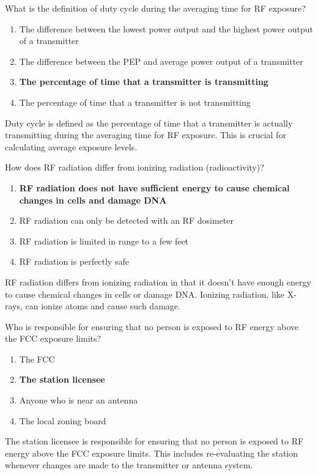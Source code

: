 \begin{tcolorbox}[colback=gray!10!white,colframe=black!75!black,title={T0C11}]
What is the definition of duty cycle during the averaging time for RF exposure?
\begin{enumerate}[label=\Alph*),noitemsep]
    \item The difference between the lowest power output and the highest power output of a transmitter
    \item The difference between the PEP and average power output of a transmitter
    \item \textbf{The percentage of time that a transmitter is transmitting}
    \item The percentage of time that a transmitter is not transmitting
\end{enumerate}
\end{tcolorbox}
Duty cycle is defined as the percentage of time that a transmitter is actually transmitting during the averaging time for RF exposure. This is crucial for calculating average exposure levels.

\begin{tcolorbox}[colback=gray!10!white,colframe=black!75!black,title={T0C12}]
How does RF radiation differ from ionizing radiation (radioactivity)?
\begin{enumerate}[label=\Alph*),noitemsep]
    \item \textbf{RF radiation does not have sufficient energy to cause chemical changes in cells and damage DNA}
    \item RF radiation can only be detected with an RF dosimeter
    \item RF radiation is limited in range to a few feet
    \item RF radiation is perfectly safe
\end{enumerate}
\end{tcolorbox}
RF radiation differs from ionizing radiation in that it doesn't have enough energy to cause chemical changes in cells or damage DNA. Ionizing radiation, like X-rays, can ionize atoms and cause such damage.

\begin{tcolorbox}[colback=gray!10!white,colframe=black!75!black,title={T0C13}]
Who is responsible for ensuring that no person is exposed to RF energy above the FCC exposure limits?
\begin{enumerate}[label=\Alph*),noitemsep]
    \item The FCC
    \item \textbf{The station licensee}
    \item Anyone who is near an antenna
    \item The local zoning board
\end{enumerate}
\end{tcolorbox}
The station licensee is responsible for ensuring that no person is exposed to RF energy above the FCC exposure limits. This includes re-evaluating the station whenever changes are made to the transmitter or antenna system.


